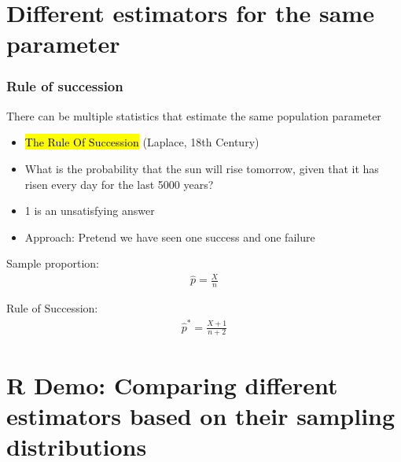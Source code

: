 \documentclass[t,compress,mathserif]{beamer}
\begin{document}

\section{Different estimators for the same parameter}


\begin{frame}
    \frametitle{Rule of succession}

    There can be multiple statistics that estimate the same population parameter
    \begin{itemize}

        \item \hl{The Rule Of Succession} (Laplace, 18th Century)
        \item What is the probability that the sun will rise tomorrow, given that it has risen every day for the last 5000 years?
        \item 1 is an unsatisfying answer
        \item Approach: Pretend we have seen one success and one failure
    
    \end{itemize}

    Sample proportion:
     \begin{align}
        \hat{p}=\frac{X}{n}
    \end{align}
 
    Rule of Succession:
    \begin{align}
        \hat{p}^*=\frac{X +1}{n+2}
    \end{align}
 
\end{frame}



\section{R Demo: Comparing different estimators based on their sampling distributions}
\end{document}
